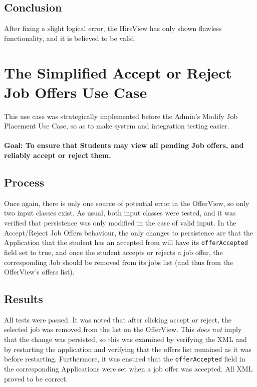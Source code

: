 \documentclass[12pt]{report}
\begin{document}
\subsection*{Conclusion}
After fixing a slight logical error, the HireView has only shown flawless functionality, and it is
believed to be valid.

\section{The Simplified Accept or Reject Job Offers Use Case}
This use case was strategically implemented before the Admin's Modify Job Placement Use Case, so as
to make system and integration testing easier.\\\\
\textbf{Goal: To ensure that Students may view all pending Job offers, and reliably accept or reject
them.}
\subsection*{Process}
Once again, there is only one source of potential error in the OfferView, so only two input classes
exist. As usual, both input classes were tested, and it was verified that persistence was only
modified in the case of valid input. In the Accept/Reject Job Offers behaviour, the only changes to
persistence are that the Application that the student has an accepted from will have its
\texttt{offerAccepted} field set to true, and once the student accepts or rejects a job offer, the
corresponding Job should be removed from its jobs list (and thus from the OfferView's offers list).
\subsection*{Results}
All tests were passed. It was noted that after clicking accept or reject, the selected job was
removed from the list on the OfferView. This \textit{does not} imply that the change was persisted,
so this was examined by verifying the XML and by restarting the application and verifying that the
offers list remained as it was before restarting. Furthermore, it was ensured that the
\texttt{offerAccepted} field in the corresponding Applications were set when a job offer was
accepted. All XML proved to be correct.
\end{document}
